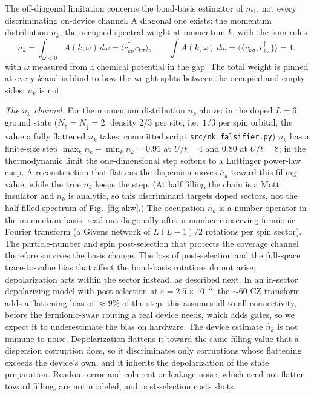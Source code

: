 \documentclass[submission, PhysCore]{SciPost}
\begin{document}
\begin{appendix}
The off-diagonal limitation concerns the bond-basis estimator of $m_1$, not every discriminating on-device channel. A diagonal one exists: the momentum distribution $n_k$, the occupied spectral weight at momentum $k$, with the sum rules
\[
n_k=\int_{\omega<0}A(k,\omega)\,d\omega=\langle c^\dagger_{k\sigma}c_{k\sigma}\rangle,\qquad
\int A(k,\omega)\,d\omega=\langle\{c_{k\sigma},c^\dagger_{k\sigma}\}\rangle=1 ,
\]
with $\omega$ measured from a chemical potential in the gap.
The total weight is pinned at every $k$ and is blind to how the weight splits between the occupied and empty sides; $n_k$ is not.

\emph{The $n_k$ channel.} For the momentum distribution $n_k$ above: in the doped $L=6$ ground state ($N_\uparrow=N_\downarrow=2$: density $2/3$ per site, i.e.\ $1/3$ per spin orbital, the value a fully flattened $n_k$ takes; committed script \texttt{src/\allowbreak nk\_falsifier.py}) $n_k$ has a finite-size step ${\max_k n_k-\min_k n_k}=0.91$ at $U/t=4$ and $0.80$ at $U/t=8$; in the thermodynamic limit the one-dimensional step softens to a Luttinger power-law cusp. A reconstruction that flattens the dispersion moves $\bar n_k$ toward this filling value, while the true $n_k$ keeps the step. (At half filling the chain is a Mott insulator and $n_k$ is analytic, so this discriminant targets doped sectors, not the half-filled spectrum of Fig.~\ref{fig:akw}.) The occupation $n_k$ is a number operator in the momentum basis, read out diagonally after a number-conserving fermionic Fourier transform (a Givens network of $L(L-1)/2$ rotations per spin sector). The particle-number and spin post-selection that protects the coverage channel therefore survives the basis change. The loss of post-selection and the full-space trace-to-value bias that affect the bond-basis rotations do not arise; depolarization acts within the sector instead, as described next. In an in-sector depolarizing model with post-selection at $\varepsilon=2.5\times10^{-3}$, the ${\sim}60$-CZ transform adds a flattening bias of ${\approx}9\%$ of the step; this assumes all-to-all connectivity, before the fermionic-\textsc{swap} routing a real device needs, which adds gates, so we expect it to underestimate the bias on hardware. The device estimate $\widehat n_k$ is not immune to noise. Depolarization flattens it toward the same filling value that a dispersion corruption does, so it discriminates only corruptions whose flattening exceeds the device's own, and it inherits the depolarization of the state preparation. Readout error and coherent or leakage noise, which need not flatten toward filling, are not modeled, and post-selection costs shots.


\end{appendix}
\end{document}
